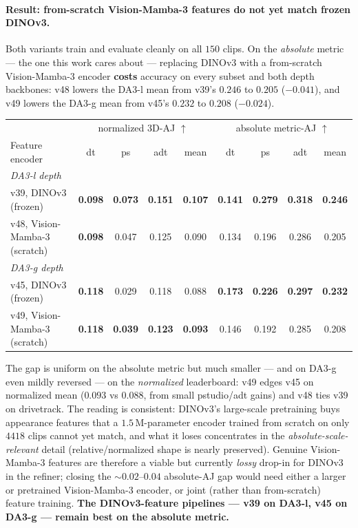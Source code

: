 \documentclass[11pt,a4paper]{article}
\begin{document}
\paragraph{Result: from-scratch Vision-Mamba-3 features do not yet match frozen DINOv3.}
Both variants train and evaluate cleanly on all $150$ clips. On the \emph{absolute} metric --- the one this
work cares about --- replacing DINOv3 with a from-scratch Vision-Mamba-3 encoder \textbf{costs} accuracy on
every subset and both depth backbones: v48 lowers the DA3-l mean from v39's $0.246$ to $0.205$ ($-0.041$),
and v49 lowers the DA3-g mean from v45's $0.232$ to $0.208$ ($-0.024$).
\begin{center}\small
\begin{tabular}{lcccc|cccc}
\toprule
 & \multicolumn{4}{c|}{normalized 3D-AJ $\uparrow$} & \multicolumn{4}{c}{absolute metric-AJ $\uparrow$} \\
Feature encoder & dt & ps & adt & mean & dt & ps & adt & mean \\
\midrule
\multicolumn{9}{l}{\emph{DA3-l depth}}\\
\quad v39, DINOv3 (frozen)          & \textbf{0.098} & \textbf{0.073} & \textbf{0.151} & \textbf{0.107} & \textbf{0.141} & \textbf{0.279} & \textbf{0.318} & \textbf{0.246} \\
\quad v48, Vision-Mamba-3 (scratch) & \textbf{0.098} & 0.047 & 0.125 & 0.090 & 0.134 & 0.196 & 0.286 & 0.205 \\
\midrule
\multicolumn{9}{l}{\emph{DA3-g depth}}\\
\quad v45, DINOv3 (frozen)          & \textbf{0.118} & 0.029 & 0.118 & 0.088 & \textbf{0.173} & \textbf{0.226} & \textbf{0.297} & \textbf{0.232} \\
\quad v49, Vision-Mamba-3 (scratch) & \textbf{0.118} & \textbf{0.039} & \textbf{0.123} & \textbf{0.093} & 0.146 & 0.192 & 0.285 & 0.208 \\
\bottomrule
\end{tabular}
\end{center}
The gap is uniform on the absolute metric but much smaller --- and on DA3-g even mildly reversed --- on the
\emph{normalized} leaderboard: v49 edges v45 on normalized mean ($0.093$ vs $0.088$, from small pstudio/adt
gains) and v48 ties v39 on drivetrack. The reading is consistent: DINOv3's large-scale pretraining buys
appearance features that a $1.5$\,M-parameter encoder trained from scratch on only $4418$ clips cannot yet
match, and what it loses concentrates in the \emph{absolute-scale-relevant} detail (relative/normalized
shape is nearly preserved). Genuine Vision-Mamba-3 features are therefore a viable but currently
\emph{lossy} drop-in for DINOv3 in the refiner; closing the ${\sim}0.02$--$0.04$ absolute-AJ gap would need
either a larger or pretrained Vision-Mamba-3 encoder, or joint (rather than from-scratch) feature training.
\textbf{The DINOv3-feature pipelines --- v39 on DA3-l, v45 on DA3-g --- remain best on the absolute metric.}
\end{document}
